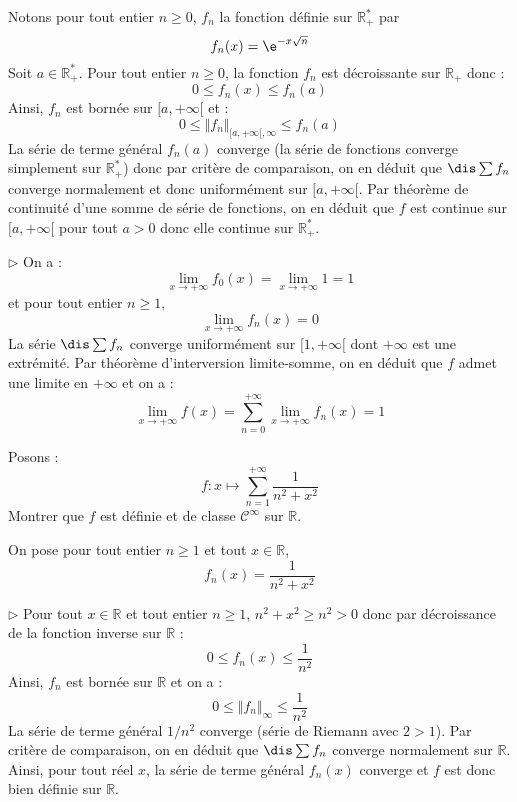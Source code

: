 \documentclass[a4paper,10pt]{report}
\begin{document}
\medskip

\noindent Notons pour tout entier $n \geq 0$, $f_n$ la fonction définie sur $\mathbb{R}_+^*$ par 
$$f_n(x)= \e^{ - x\sqrt n}$$
Soit $a \in \mathbb{R}_+^*$. Pour tout entier $n \geq 0$, la fonction $f_n$ est décroissante sur $\mathbb{R}_+$ donc :
$$ 0 \leq f_n(x) \leq f_n(a)$$
Ainsi, $f_n$ est bornée sur $[a, + \infty[$ et :
$$ 0 \leq \Vert f_n \Vert_{[a, + \infty[, \infty} \leq f_n(a)$$
La série de terme général $f_n(a)$ converge (la série de fonctions converge simplement sur $\mathbb{R}_+^*$) donc par critère de comparaison, on en déduit que $\dis \sum f_n$ converge normalement et donc uniformément sur $[a, + \infty[$. Par théorème de continuité d'une somme de série de fonctions, on en déduit que $f$ est continue sur $[a, + \infty[$ pour tout $a>0$ donc elle continue sur $\mathbb{R}_+^*$.

\medskip

\noindent $\rhd$ On a :
$$ \lim_{x \rightarrow + \infty} f_0(x) = \lim_{x \rightarrow + \infty} 1 = 1$$
et pour tout entier $n \geq 1$,
$$ \lim_{x \rightarrow + \infty} f_n(x) = 0$$
La série $\dis \sum f_n$ converge uniformément sur $[1, + \infty[$ dont $+ \infty$ est une extrémité. Par théorème d'interversion limite-somme, on en déduit que $f$ admet une limite en $+ \infty$ et on a :
$$ \lim_{x \rightarrow + \infty} f(x) = \sum_{n=0}^{+ \infty} \lim_{x \rightarrow + \infty} f_n(x) = 1$$

\begin{Exa} Posons :
$$f: x \mapsto \sum_{n=1}^{+ \infty} \dfrac{1}{n^2+x^2}$$
Montrer que $f$ est définie et de classe $\mathcal{C}^{\infty}$ sur $\mathbb{R}$.
\end{Exa} 

\corr On pose pour tout entier $n \geq 1$ et tout $x \in \mathbb{R}$,
$$ f_n(x) = \dfrac{1}{n^2+x^2}$$

\medskip

\noindent $\rhd$ Pour tout $x \in \mathbb{R}$ et tout entier $n \geq 1$, $n^2+x^2 \geq n^2>0$ donc par décroissance de la fonction inverse sur $\mathbb{R}$ :
$$ 0 \leq f_n(x) \leq \dfrac{1}{n^2}$$
Ainsi, $f_n$ est bornée sur $\mathbb{R}$ et on a :
$$ 0 \leq \Vert f_n \Vert_{\infty} \leq \dfrac{1}{n^2}$$
La série de terme général $1/n^2$ converge (série de Riemann avec $2>1$). Par critère de comparaison, on en déduit que $\dis \sum f_n$ converge normalement sur $\mathbb{R}$. Ainsi, pour tout réel $x$, la série de terme général $f_n(x)$ converge et $f$ est donc bien définie sur $\mathbb{R}$.
\end{document}
